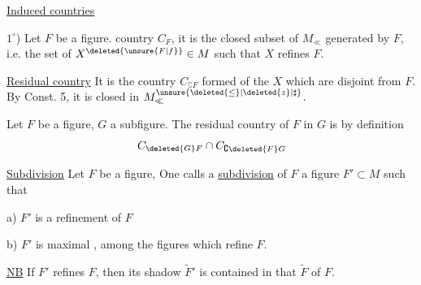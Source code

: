 \uline{Induced countries}

$1^\circ$) Let $F$ be a figure.  country $C_F$,  it is the closed subset of $M_{\ll}$ generated by $F$, i.e. the set of $X^{\deleted{\unsure{F|f}}}\in M$ such that $X$ refines $F$.

\uline{Residual country} It is the country $C_{\complement F}$  formed of the $X$  which are disjoint from $F$. By Const. 5, it is   closed in $M^{\unsure{\deleted{\leq}|\deleted{z}|\sharp}}_{\ll}$.

 Let $F$ be a figure, $G$ a  subfigure. The residual country of $F$ in $G$ is by definition
\[
 C_{\deleted{G}F}\cap C_{\complement\deleted{F}G}
\]

\uline{Subdivision} Let $F$  be a figure,  One calls a \uline{subdivision} of $F$ a figure $F'\subset M$ such that

a) $F'$ is a refinement of $F$

b) $F'$ is maximal , among the  figures which refine $F$.

\uline{NB} If $F'$ refines $F$, then its shadow $\widetilde F'$ is contained in that $\widetilde F$ of $F$.
